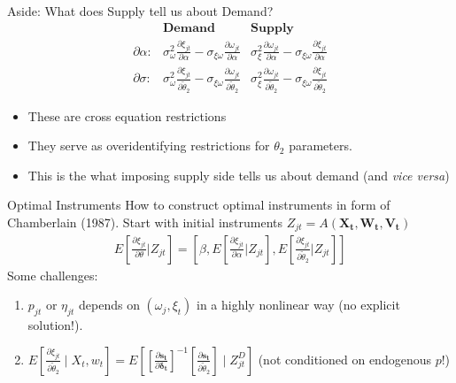 \documentclass[xcolor=pdftex,dvipsnames,table,mathserif,aspectratio=169]{beamer}
\newcommand{\del}{\partial}
\begin{document}
\begin{frame}{Aside: What does Supply tell us about Demand?}
\begin{align*}
& \textbf{Demand} & \textbf{Supply} \\
\del \alpha:& 
        \sigma_\omega^2 \frac{\partial \xi_{jt}}{\partial \alpha} - 
        \sigma_{\xi\omega}\frac{\partial \omega_{jt}}{\partial \alpha} 
        & \sigma_{\xi}^2 \frac{\partial \omega_{jt}}{\partial \alpha}  - 
        \sigma_{\xi\omega}\frac{\partial \xi_{jt}}{\partial \alpha}  \\
\del \sigma:& 
        \sigma_\omega^2 \frac{\partial \xi_{jt}}{\partial \widetilde{\theta}_2}  -
        \sigma_{\xi\omega}\frac{\partial \omega_{jt}}{\partial \widetilde{\theta}_2} 
        & \sigma_{\xi}^2 \frac{\partial \omega_{jt}}{\partial \widetilde{\theta}_2} - 
        \sigma_{\xi\omega}\frac{\partial \xi_{jt}}{\partial \widetilde{\theta}_2}
\end{align*}
\begin{itemize}
\item These are \alert{cross equation restrictions}
\item They serve as \alert{overidentifying restrictions} for $\theta_2$ parameters.
\item This is the what imposing supply side tells us about demand (and \textit{vice versa})
\end{itemize}
\end{frame}


\begin{frame}{Optimal Instruments}
How to construct optimal instruments in form of Chamberlain (1987). Start with initial instruments $Z_{jt}=A\left(\mathbf{X_t},\mathbf{W_t},\mathbf{V_t}\right)$
\begin{eqnarray*}
E\left[\frac{\partial \xi_{jt}}{\partial \theta} | Z_{jt} \right] = \left[\beta, E\left[\frac{\partial \xi_{jt}}{\partial \alpha} | Z_{jt} \right] ,
 E\left[\frac{\partial \xi_{jt}}{\partial \widetilde{\theta}_2} | Z_{jt} \right] \right]
\end{eqnarray*}
Some challenges:
\begin{enumerate}
\item $p_{jt}$ or $\eta_{jt}$ depends on $(\omega_{j},\xi_{t})$ in a highly nonlinear way (no explicit solution!).
\item $E\left[\frac{\partial \xi_{jt}}{\partial \widetilde{\theta}_2} \mid X_t, w_{t} \right] =E\left[\left[\frac{\partial \mathbf{s_t}}{\partial \mathbf{\delta_t}}\right]^{-1} 
\left[\frac{\partial \mathbf{s_t}}{\partial \widetilde{\theta}_2}\right] \mid Z_{jt}^D \right]$  (not conditioned on endogenous $p$!)
\end{enumerate}
\end{frame}
\end{document}
